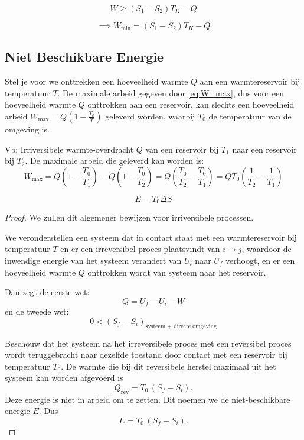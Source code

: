 \[
W \geq (S_1-S_2)T_K - Q
\] 

\begin{equation}
\label{eq:W_min}
\implies W_{\text{min}} = (S_1-S_2)T_K - Q
\end{equation}

\subsection{Niet Beschikbare Energie}

Stel je voor we onttrekken een hoeveelheid warmte \(Q\) aan een warmtereservoir bij temperatuur \(T\).
De maximale arbeid gegeven door \eqref{eq:W_max}, dus voor een hoeveelheid warmte \(Q\) onttrokken aan een reservoir,
kan slechts een hoeveelheid arbeid \(W_{\text{max}} = Q \left(1 - \frac{T_0}{T}\right)\) geleverd worden, waarbij \(T_0\) de temperatuur van de omgeving is.

Vb: Irriversibele warmte-overdracht \(Q\) van een reservoir bij \(T_1\) naar een reservoir bij \(T_2\). 
De maximale arbeid die geleverd kan worden is:
\[
W_{\text{max}} 
= 
Q \left(1 - \frac{T_0}{T_1}\right) - Q \left(1 - \frac{T_0}{T_2}\right) 
=
Q \left(\frac{T_0}{T_2} - \frac{T_0}{T_1}\right) 
= 
Q T_0 \left(\frac{1}{T_2} - \frac{1}{T_1}\right)
\]  

\[E = T_0 \Delta S\]

\begin{proof}
    We zullen dit algemener bewijzen voor irriversibele processen. 

    We veronderstellen een systeem dat in contact staat met een warmtereservoir bij temperatuur \(T\) en er een irreversibel proces plaatsvindt van \(i \to j\),
    waardoor de inwendige energie van het systeem verandert van \(U_i\) naar \(U_f\) verhoogt, en er een hoeveelheid warmte \(Q\) onttrokken wordt van systeem naar het reservoir.
    
    Dan zegt de eerste wet:
    \[Q = U_f - U_i - W\]
    en de tweede wet:
    \[0 < (S_f-S_i)_{\text{systeem + directe omgeving}}\]

    Beschouw dat het systeem na het irreversibele proces met een reversibel proces wordt teruggebracht
    naar dezelfde toestand door contact met een reservoir bij temperatuur $T_0$.
    De warmte die bij dit reversibele herstel maximaal uit het systeem kan worden afgevoerd is
    \[Q_{\mathrm{rev}} = T_0\,(S_f - S_i).\]
    Deze energie is niet in arbeid om te zetten. Dit noemen we de niet-beschikbare energie $E$. Dus
    \[E = T_0\,(S_f - S_i).\]
\end{proof}

